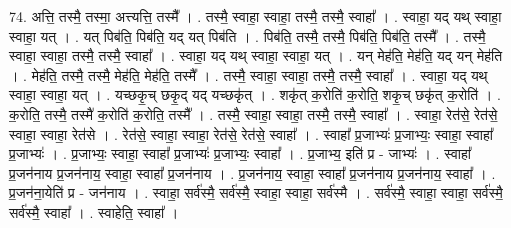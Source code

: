 \documentclass[17pt]{extarticle}
\begin{document}
74. अत्ति॒ तस्मै॒ तस्मा॒ अत्त्यत्ति॒ तस्मै᳚ । . तस्मै॒ स्वाहा॒ स्वाहा॒ तस्मै॒ तस्मै॒ स्वाहा᳚ । . स्वाहा॒ यद् यथ् स्वाहा॒ स्वाहा॒ यत् । . यत् पिब॑ति॒ पिब॑ति॒ यद् यत् पिब॑ति । . पिब॑ति॒ तस्मै॒ तस्मै॒ पिब॑ति॒ पिब॑ति॒ तस्मै᳚ । . तस्मै॒ स्वाहा॒ स्वाहा॒ तस्मै॒ तस्मै॒ स्वाहा᳚ । . स्वाहा॒ यद् यथ् स्वाहा॒ स्वाहा॒ यत् । . यन् मेह॑ति॒ मेह॑ति॒ यद् यन् मेह॑ति । . मेह॑ति॒ तस्मै॒ तस्मै॒ मेह॑ति॒ मेह॑ति॒ तस्मै᳚ । . तस्मै॒ स्वाहा॒ स्वाहा॒ तस्मै॒ तस्मै॒ स्वाहा᳚ । . स्वाहा॒ यद् यथ् स्वाहा॒ स्वाहा॒ यत् । . यच्छकृ॒च् छकृ॒द् यद् यच्छकृ॑त् । . शकृ॑त् क॒रोति॑ क॒रोति॒ शकृ॒च् छकृ॑त् क॒रोति॑ । . क॒रोति॒ तस्मै॒ तस्मै॑ क॒रोति॑ क॒रोति॒ तस्मै᳚ । . तस्मै॒ स्वाहा॒ स्वाहा॒ तस्मै॒ तस्मै॒ स्वाहा᳚ । . स्वाहा॒ रेत॑से॒ रेत॑से॒ स्वाहा॒ स्वाहा॒ रेत॑से । . रेत॑से॒ स्वाहा॒ स्वाहा॒ रेत॑से॒ रेत॑से॒ स्वाहा᳚ । . स्वाहा᳚ प्र॒जाभ्यः॑ प्र॒जाभ्यः॒ स्वाहा॒ स्वाहा᳚ प्र॒जाभ्यः॑ । . प्र॒जाभ्यः॒ स्वाहा॒ स्वाहा᳚ प्र॒जाभ्यः॑ प्र॒जाभ्यः॒ स्वाहा᳚ । . प्र॒जाभ्य॒ इति॑ प्र - जाभ्यः॑ । . स्वाहा᳚ प्र॒जन॑नाय प्र॒जन॑नाय॒ स्वाहा॒ स्वाहा᳚ प्र॒जन॑नाय । . प्र॒जन॑नाय॒ स्वाहा॒ स्वाहा᳚ प्र॒जन॑नाय प्र॒जन॑नाय॒ स्वाहा᳚ । . प्र॒जन॑ना॒येति॑ प्र - जन॑नाय । . स्वाहा॒ सर्व॑स्मै॒ सर्व॑स्मै॒ स्वाहा॒ स्वाहा॒ सर्व॑स्मै । . सर्व॑स्मै॒ स्वाहा॒ स्वाहा॒ सर्व॑स्मै॒ सर्व॑स्मै॒ स्वाहा᳚ । . स्वाहेति॒ स्वाहा᳚ । \newline
\end{document}
